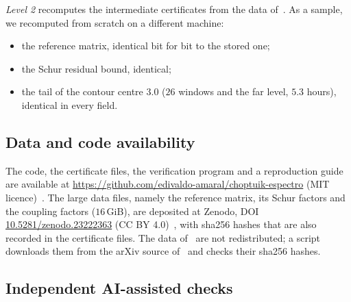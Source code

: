 \emph{Level 2} recomputes the intermediate certificates from the data of~\cite{RT2019}. As a sample, we recomputed
from scratch on a different machine:
\begin{itemize}[leftmargin=*]
\item the reference matrix, identical bit for bit to the stored one;
\item the Schur residual bound, identical;
\item the tail of the contour centre $3.0$ ($26$ windows and the far level, $5.3$ hours), identical in every field.
\end{itemize}

\subsection{Data and code availability}\label{sec:computation-data}

The code, the certificate files, the verification program and a reproduction guide are available at
\url{https://github.com/edivaldo-amaral/choptuik-espectro} (MIT licence)~\cite{Repo2026}. The large data files, namely the reference
matrix, its Schur factors and the coupling factors ($16$\,GiB), are deposited at Zenodo, DOI
\href{https://doi.org/10.5281/zenodo.23222363}{10.5281/zenodo.23222363} (CC BY 4.0)~\cite{Zenodo2026}, with sha256 hashes that are
also recorded in the certificate files. The data of~\cite{RT2019} are not redistributed; a script downloads them
from the arXiv source of~\cite{RT2019} and checks their sha256 hashes.

\subsection{Independent AI-assisted checks}\label{sec:computation-reviews}

